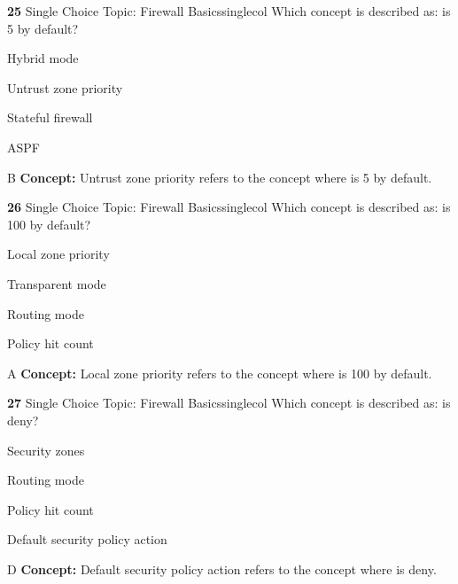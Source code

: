 \documentclass[10pt,a4paper]{article}
\begin{document}
\begin{qcard}{\color{white}\textbf{25} \hfill \small Single Choice \textbar{} Topic: Firewall Basics}{singlecol}
Which concept is described as: is 5 by default?

\begin{qoptions}
\item Hybrid mode
\item Untrust zone priority
\item Stateful firewall
\item ASPF
\end{qoptions}
\begin{explainbox}{B}
\textbf{Concept:} Untrust zone priority refers to the concept where is 5 by default.
\end{explainbox}
\end{qcard}

\begin{qcard}{\color{white}\textbf{26} \hfill \small Single Choice \textbar{} Topic: Firewall Basics}{singlecol}
Which concept is described as: is 100 by default?

\begin{qoptions}
\item Local zone priority
\item Transparent mode
\item Routing mode
\item Policy hit count
\end{qoptions}
\begin{explainbox}{A}
\textbf{Concept:} Local zone priority refers to the concept where is 100 by default.
\end{explainbox}
\end{qcard}

\begin{qcard}{\color{white}\textbf{27} \hfill \small Single Choice \textbar{} Topic: Firewall Basics}{singlecol}
Which concept is described as: is deny?

\begin{qoptions}
\item Security zones
\item Routing mode
\item Policy hit count
\item Default security policy action
\end{qoptions}
\begin{explainbox}{D}
\textbf{Concept:} Default security policy action refers to the concept where is deny.
\end{explainbox}
\end{qcard}
\end{document}
